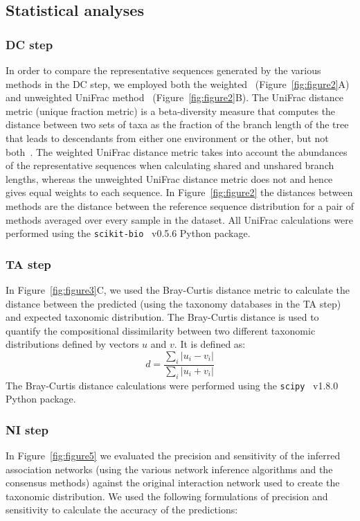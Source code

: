 \documentclass[letterpaper,12pt]{article}
\begin{document}
  \subsection*{Statistical analyses}

  \subsubsection*{DC step}
  \vspace{-5mm}
  In order to compare the representative sequences generated by the various methods in the DC step, we employed both the weighted~\cite{Lozupone2007} (Figure~\ref{fig:figure2}A) and unweighted UniFrac method~\cite{Lozupone2005} (Figure~\ref{fig:figure2}B).
  The UniFrac distance metric (unique fraction metric) is a beta-diversity measure that computes the distance between two sets of taxa as the fraction of the branch length of the tree that leads to descendants from either one environment or the other, but not both~\cite{Lozupone2005}.
  The weighted UniFrac distance metric takes into account the abundances of the representative sequences when calculating shared and unshared branch lengths, whereas the unweighted UniFrac distance metric does not and hence gives equal weights to each sequence.
  In Figure~\ref{fig:figure2} the distances between methods are the distance between the reference sequence distribution for a pair of methods averaged over every sample in the dataset.
  All UniFrac calculations were performed using the \texttt{scikit-bio}~\cite{thescikit-biodevelopmentteamScikitbioBioinformaticsLibrary2022} v0.5.6 Python package.

  \subsubsection*{TA step}
  \vspace{-5mm}
  In Figure~\ref{fig:figure3}C, we used the Bray-Curtis distance metric to calculate the distance between the predicted (using the taxonomy databases in the TA step) and expected taxonomic distribution.
  The Bray-Curtis distance is used to quantify the compositional dissimilarity between two different taxonomic distributions defined by vectors $u$ and $v$.
  It is defined as:
  $$d = \frac{\sum_i{|u_i-v_i|}}{\sum_i{|u_i+v_i|}}$$
  The Bray-Curtis distance calculations were performed using the \texttt{scipy}~\cite{virtanenSciPyFundamentalAlgorithms2020} v1.8.0 Python package.

  \subsubsection*{NI step}
  \vspace{-5mm}
  In Figure~\ref{fig:figure5} we evaluated the precision and sensitivity of the inferred association networks (using the various network inference algorithms and the consensus methods) against the original interaction network used to create the taxonomic distribution.
  We used the following formulations of precision and sensitivity to calculate the accuracy of the predictions:
\end{document}
